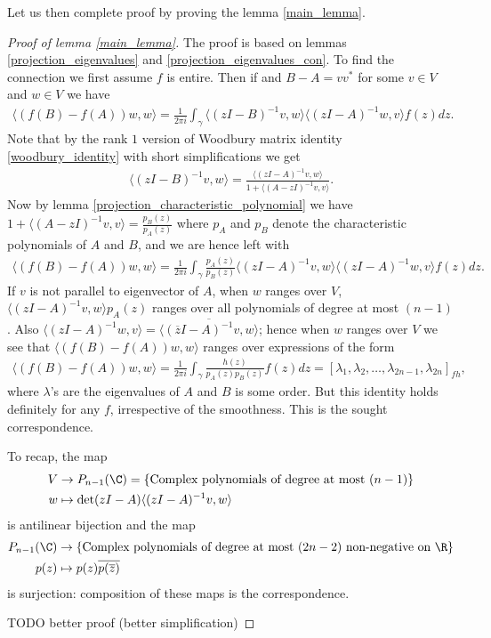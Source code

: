 Let us then complete proof by proving the lemma \ref{main_lemma}.

\begin{proof}[Proof of lemma \ref{main_lemma}]
	The proof is based on lemmas \ref{projection_eigenvalues} and \ref{projection_eigenvalues_con}. To find the connection we first assume $f$ is entire. Then if and $B - A = v v^{*}$ for some $v \in V$ and $w \in V$ we have
	\begin{align*}
		\langle (f(B) - f(A)) w, w \rangle = \frac{1}{2 \pi i}\int_{\gamma} \langle (z I - B)^{-1} v, w \rangle  \langle (z I - A)^{-1} w, v \rangle f(z) dz.
	\end{align*}
	Note that by the rank $1$ version of Woodbury matrix identity \ref{woodbury_identity} with short simplifications we get
	\begin{align*}
		\langle (z I - B)^{-1} v, w \rangle = \frac{\langle (z I - A)^{-1} v, w\rangle}{1 + \langle (A - z I)^{-1} v, v \rangle}.
	\end{align*}
	Now by lemma \ref{projection_characteristic_polynomial} we have $1 + \langle (A - z I)^{-1} v, v \rangle = \frac{p_{B}(z)}{p_{A}(z)}$ where $p_{A}$ and $p_{B}$ denote the characteristic polynomials of $A$ and $B$, and we are hence left with
	\begin{align*}
		\langle (f(B) - f(A)) w, w \rangle = \frac{1}{2 \pi i}\int_{\gamma} \frac{p_{A}(z)}{p_{B}(z)}\langle (z I - A)^{-1} v, w\rangle \langle (z I - A)^{-1} w, v \rangle f(z) dz.
	\end{align*}
	If $v$ is not parallel to eigenvector of $A$, when $w$ ranges over $V$, $\langle (z I - A)^{-1} v, w\rangle p_{A}(z)$ ranges over all polynomials of degree at most $(n - 1)$. Also $\langle (z I - A)^{-1} w, v \rangle = \overline{\langle (\overline{z} I - A)^{-1} v, w \rangle}$; hence when $w$ ranges over $V$ we see that $\langle (f(B) - f(A)) w, w \rangle$ ranges over expressions of the form
	\begin{align*}
		\langle (f(B) - f(A)) w, w \rangle = \frac{1}{2 \pi i}\int_{\gamma} \frac{h(z)}{p_{A}(z)p_{B}(z)} f(z) dz = [\lambda_{1}, \lambda_{2}, \ldots, \lambda_{2 n - 1}, \lambda_{2 n}]_{f h},
	\end{align*}
	where $\lambda$'s are the eigenvalues of $A$ and $B$ is some order. But this identity holds definitely for any $f$, irrespective of the smoothness. This is the sought correspondence.

	To recap, the map
	\begin{align*}
		V &\to P_{n - 1}(\C) = \{\text{Complex polynomials of degree at most } (n - 1) \} \\
		w &\mapsto \det(z I - A) \langle (z I - A)^{-1} v, w \rangle
	\end{align*}
	is antilinear bijection and the map
	\begin{align*}
		P_{n - 1}(\C) &\to \{\text{Complex polynomials of degree at most } (2 n - 2) \text{ non-negative on } \R \} \\
		p(z) &\mapsto p(z) \overline{p(\overline{z})}
	\end{align*}
	is surjection: composition of these maps is the correspondence.

	TODO better proof (better simplification)
\end{proof}

